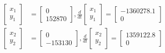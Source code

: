 \begin{equation}
\begin{align*}
\left[ \begin{matrix} x_{ 1 } \\ y_{ 1 } \end{matrix} \right] &=\left[ \begin{matrix} 0 \\ 152870 \end{matrix} \right] ,\frac { d }{ dt } \left[ \begin{matrix} x_{ 1 } \\ y_{ 1 } \end{matrix} \right] =\left[ \begin{matrix} -1360278.1 \\ 0 \end{matrix} \right]  \\
\left[ \begin{matrix} x_{ 2 } \\ y_{ 2 } \end{matrix} \right] &=\left[ \begin{matrix} 0 \\ -153130 \end{matrix} \right] ,\frac { d }{ dt } \left[ \begin{matrix} x_{ 2 } \\ y_{ 2 } \end{matrix} \right] =\left[ \begin{matrix} 1359122.8 \\ 0 \end{matrix} \right] 
\end{align*}
\label{eq:2}
\end{equation}


